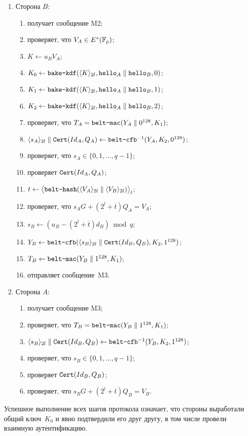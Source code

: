 \begin{enumerate}
\item
Сторона $B$:
\begin{enumerate}
\item
получает сообщение M2;
\item
проверяет, что $V_A\in E^*(\mathbb{F}_p)$;
\item
$K\leftarrow u_B V_A$;
\item
$K_0\leftarrow\texttt{bake-kdf}
(\langle K\rangle_{2l},\texttt{hello}_A\parallel\texttt{hello}_B,0)$;
\item
$K_1\leftarrow\texttt{bake-kdf}
(\langle K\rangle_{2l},\texttt{hello}_A\parallel\texttt{hello}_B,1)$;
\item
$K_2\leftarrow\texttt{bake-kdf}
(\langle K\rangle_{2l},\texttt{hello}_A\parallel\texttt{hello}_B,2)$;
\item
проверяет, 
что $T_A=\texttt{belt-mac}
(Y_A\parallel 0^{128}, K_1)$;
\item
$\langle s_A\rangle_{2l}\parallel\texttt{Cert}(Id_A,Q_A)
\leftarrow\texttt{belt-cfb}^{-1}(Y_A,K_2,0^{128})$;
\item
проверяет, что $s_A\in\{0,1,\ldots,q-1\}$;
\item
проверяет $\texttt{Cert}(Id_A,Q_A)$;
\item
$t\leftarrow\bigl\langle\texttt{belt-hash}
(\langle V_A\rangle_{2l}\parallel \langle V_B\rangle_{2l})
\bigr\rangle_l$;
\item
проверяет, что $s_A G+(2^l +\overline{t})Q_A=V_A$;
\item
$s_B\leftarrow (u_B-(2^l+\overline{t})d_B)\bmod q$;
\item
$Y_B\leftarrow\texttt{belt-cfb}
(\langle s_B\rangle_{2l}\parallel\texttt{Cert}(Id_B,Q_B),K_2,1^{128})$;
\item
$T_B\leftarrow\texttt{belt-mac}
(Y_B\parallel 1^{128}, K_1)$;
\item
отправляет сообщение~M3.
\end{enumerate}

\item
Сторона $A$:
\begin{enumerate}
\item
получает сообщение M3;
\item
проверяет, 
что $T_B=\texttt{belt-mac}
(Y_B\parallel 1^{128}, K_1)$;
\item
$\langle s_B\rangle_{2l}\parallel\texttt{Cert}(Id_B,Q_B)
\leftarrow\texttt{belt-cfb}^{-1}(Y_B,K_2,1^{128})$;
\item
проверяет, что $s_B\in\{0,1,\ldots,q-1\}$;
\item
проверяет $\texttt{Cert}(Id_B,Q_B)$;
\item
проверяет, что $s_B G+(2^l +\overline{t})Q_B=V_B$.
\end{enumerate}
\end{enumerate}

Успешное выполнение всех шагов протокола означает, что 
стороны выработали общий ключ~$K_0$ 
и явно подтвердили его друг другу, 
в том числе провели взаимную аутентификацию.

